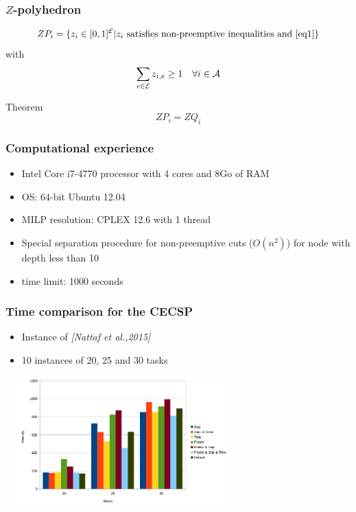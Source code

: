\begin{frame}
  \frametitle{$Z$-polyhedron}
  \[ZP_i=\{ z_i \in [0,1]^{\cal E} | z_i\text{ satisfies
      non-preemptive inequalities and } \eqref{eq1}\}\] 
  \pause
  with 
  \begin{equation}
    \sum_{e \in \cal E} z_{i,e} \ge 1 \quad \forall i \in \cal A  
    \label{eq1}  
  \end{equation}
  \pause
  \begin{block}{Theorem}
    \[ZP_i=ZQ_i\]
  \end{block}
  \vspace{0.3cm}

\end{frame}


\begin{frame}
\frametitle{Computational experience}
\begin{itemize}
\vfill
\item Intel Core i7-4770 processor with 4 cores and 8Go of RAM
\vfill
\item OS: 64-bit Ubuntu 12.04
\vfill
\item MILP resolution: CPLEX 12.6 with 1 thread  
\vfill
\item Special separation procedure for non-preemptive cuts ($O(n^2)$)
  for node with depth less than 10
\vfill
\item time limit: 1000 seconds
\vfill
\end{itemize}
\end{frame}

\begin{frame}
\frametitle{Time comparison for the CECSP}
\begin{itemize}
\item Instance of {\it [Nattaf et al.,2015]}
\item 10 instances of 20, 25 and 30 tasks
\end{itemize}
\vfill
\begin{center}
\includegraphics[height=5cm, width=9cm]{time_CECSP.png}
\end{center}
\end{frame}


